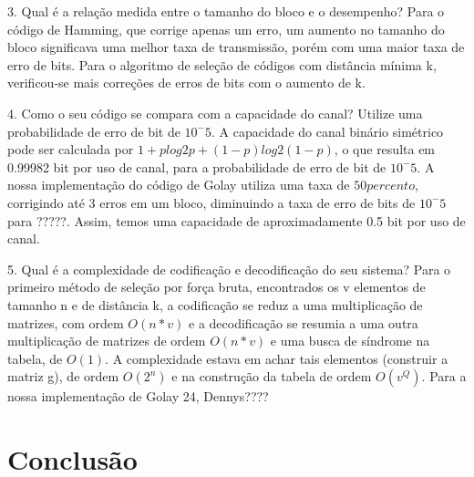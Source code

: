 \documentclass[%
aip,
jmp,%
amsmath,amssymb,
reprint,%
]{revtex4-1}
\begin{document}
	3. Qual é a relação medida entre o tamanho do bloco e o desempenho?
	Para o código de Hamming, que corrige apenas um erro, um aumento no tamanho do bloco significava uma melhor taxa de transmissão, porém com uma maior taxa de erro de bits.
	Para o algoritmo de seleção de códigos com distância mínima k, verificou-se mais correções de erros de bits com o aumento de k.
	
	4. Como o seu código se compara com a capacidade do canal? Utilize uma probabilidade de erro de bit de $10^-5$.
	A capacidade do canal binário simétrico pode ser calculada por $1 + p log2 p  + (1 - p) log2 (1 - p)$, o que resulta em 0.99982 bit por uso de canal, para a probabilidade de erro de bit de $10^-5$. A nossa implementação do código de Golay utiliza uma taxa de $50 percento$, corrigindo até 3 erros em um bloco, diminuindo a taxa de erro de bits de $10^-5$ para ?????. Assim, temos uma capacidade de aproximadamente 0.5 bit por uso de canal.
	
	5. Qual é a complexidade de codificação e decodificação do seu sistema?
	Para o primeiro método de seleção por força bruta, encontrados os v elementos de tamanho n e de distância k, a codificação se reduz a uma multiplicação de matrizes, com ordem $O(n*v)$ e a decodificação se resumia a uma outra multiplicação de matrizes de ordem $O(n*v)$ e uma busca de síndrome na tabela, de $O(1)$. A complexidade estava em achar tais elementos (construir a matriz g), de ordem $O(2^n)$ e na construção da tabela de ordem $O(v^Q)$.
	Para a nossa implementação de Golay 24, Dennys????
	
	
	\section{Conclus\~ao}
	
	
	
	
	
\flushleft
\flushleft

\pagebreak
\newpage
\newpage

\cleardoublepage
{}
{}


\end{document}
